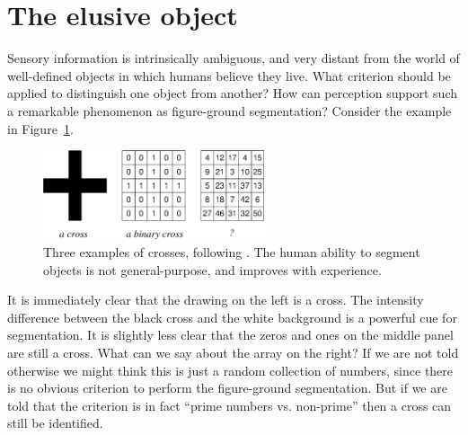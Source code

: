 






\section{The elusive object}

Sensory information is intrinsically ambiguous, and very distant from
the world of well-defined objects in which humans believe they live.
What criterion should be applied to distinguish one object from
another?  How can perception support such a remarkable phenomenon as
figure-ground segmentation?  Consider the example in
Figure~\ref{fig:number-cross}.
%
\begin{figure}[tbh]
\begin{center}
\includegraphics[width=6.5cm]{number-cross.eps}
\caption{ 
\label{fig:number-cross}
%
Three examples of crosses, following \cite{manzotti01coscienza}.  The
human ability to segment objects is not general-purpose, and improves
with experience.
%
}
\end{center}
\end{figure}
%
It is immediately clear that the drawing on the left is a cross.
The intensity difference between the black cross and the 
white background is
a powerful cue for segmentation.
It is slightly less clear
that the zeros and ones on the middle panel are still a cross. What
can we say about the array on the right?  If we are not told otherwise
we might think this is just a random collection of numbers, since there
is no obvious
criterion to perform the figure-ground segmentation. But if we
are told that the criterion is in fact ``prime numbers vs. non-prime'' then a
cross can still be identified.


